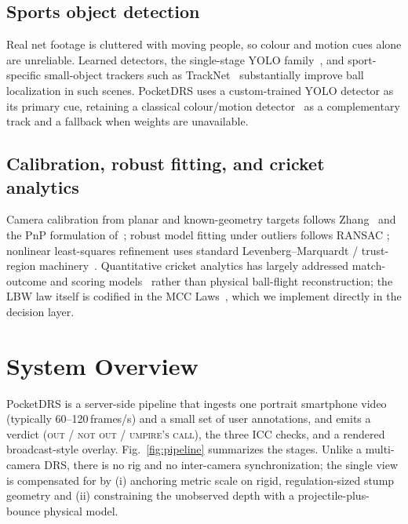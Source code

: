 \documentclass[journal]{IEEEtran}
\begin{document}
\subsection{Sports object detection}
Real net footage is cluttered with moving people, so colour and motion cues
alone are unreliable. Learned detectors, the single-stage YOLO
family~\cite{redmon2016yolo,jocher2023ultralytics}, and sport-specific
small-object trackers such as TrackNet~\cite{huang2019tracknet} substantially
improve ball localization in such scenes. PocketDRS uses a custom-trained YOLO
detector as its primary cue, retaining a classical colour/motion
detector~\cite{bradski2000opencv} as a complementary track and a fallback when
weights are unavailable.

\subsection{Calibration, robust fitting, and cricket analytics}
Camera calibration from planar and known-geometry targets follows
Zhang~\cite{zhang2000calibration} and the PnP formulation
of~\cite{hartley2004mvg}; robust model fitting under outliers follows RANSAC
\cite{fischler1981ransac}; nonlinear least-squares refinement uses standard
Levenberg--Marquardt / trust-region machinery~\cite{more1978lm,virtanen2020scipy}.
Quantitative cricket analytics has largely addressed match-outcome and scoring
models~\cite{bailey2006cricket} rather than physical ball-flight reconstruction;
the LBW law itself is codified in the MCC Laws~\cite{mcc2017laws}, which we
implement directly in the decision layer.

\section{System Overview}
\label{sec:overview}

PocketDRS is a server-side pipeline that ingests one portrait smartphone video
(typically 60--120\,frames/s) and a small set of user annotations, and emits a
verdict (\textsc{out} / \textsc{not out} / \textsc{umpire's call}), the three
ICC checks, and a rendered broadcast-style overlay. Fig.~\ref{fig:pipeline}
summarizes the stages. Unlike a multi-camera DRS, there is no rig and no
inter-camera synchronization; the single view is compensated for by (i)
anchoring metric scale on rigid, regulation-sized stump geometry and (ii)
constraining the unobserved depth with a projectile-plus-bounce physical model.
\end{document}
